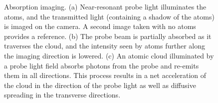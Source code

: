 \begin{figure}
\caption[Absorption imaging]{Absorption imaging. (a) Near-resonant probe light illuminates the atoms, and the transmitted light (containing a shadow of the atoms) is imaged on the camera. A second image taken with no atoms provides a reference. (b)  The probe beam is partially absorbed as it traverses the cloud, and the intensity seen by atoms further along the imaging direction \ez{} is lowered.  (c) An atomic cloud illuminated by a probe light field absorbs photons from the probe and re-emits them in all directions. This process results in a net acceleration of the cloud in the direction of the probe light as well as diffusive spreading in the transverse directions.  }
\label{fig:absorptionIntor}
\end{figure}

